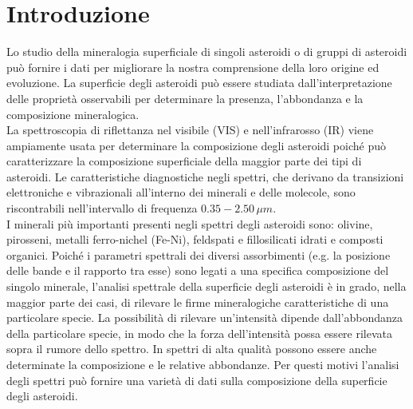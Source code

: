 \documentclass[a4paper,11pt,openright]{book}
\begin{document}
\section{Introduzione}
Lo studio della mineralogia superficiale di singoli asteroidi o di gruppi di asteroidi può fornire i dati per migliorare la nostra comprensione della loro origine ed evoluzione. La superficie degli asteroidi può essere studiata dall'interpretazione delle proprietà osservabili per determinare la presenza, l'abbondanza e la composizione mineralogica.\\
La spettroscopia di riflettanza nel visibile (VIS) e nell'infrarosso (IR) viene ampiamente usata per determinare la composizione degli asteroidi poiché può caratterizzare la composizione superficiale della maggior parte dei tipi di asteroidi. Le caratteristiche diagnostiche negli spettri, che derivano da transizioni elettroniche e vibrazionali all'interno dei minerali e delle molecole, sono riscontrabili nell'intervallo di frequenza $0.35-2.50\,\mu m$.\\
I minerali più importanti presenti negli spettri degli asteroidi sono: olivine, pirosseni, metalli ferro-nichel (Fe-Ni), feldspati e fillosilicati idrati e composti organici. Poiché i parametri spettrali dei diversi assorbimenti (e.g. la posizione delle bande e il rapporto tra esse) sono legati a una specifica composizione del singolo minerale, l'analisi spettrale della superficie degli asteroidi è in grado, nella maggior parte dei casi, di rilevare le firme mineralogiche caratteristiche di una particolare specie. La possibilità di rilevare un'intensità dipende dall'abbondanza della particolare specie, in modo che la forza dell'intensità possa essere rilevata sopra il rumore dello spettro. In spettri di alta qualità possono essere anche determinate la composizione e le relative abbondanze. Per questi motivi l'analisi degli spettri può fornire una varietà di dati sulla composizione della superficie degli asteroidi.\\
\end{document}
